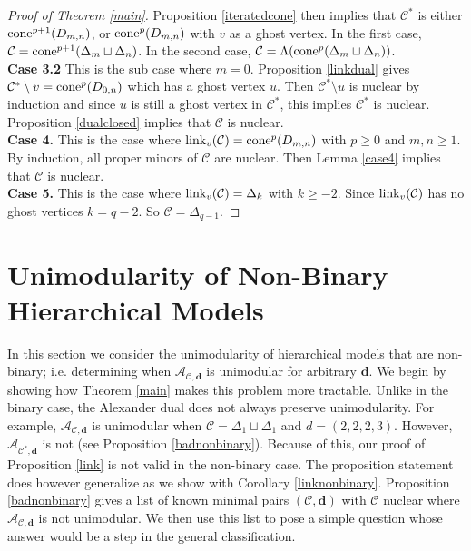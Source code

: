 \documentclass[letterpaper,12pt]{amsart}
\theoremstyle{plain}
\theoremstyle{definition}
\theoremstyle{remark}
\newcommand{\bfd}{\mathbf{d}}
\newcommand{\calc}{\mathcal{C}}
\newcommand{\link}{\textnormal{link}}
\newcommand{\cone}{\textnormal{cone}}
\begin{document}
\begin{proof}[Proof of Theorem \ref{main}]
	Proposition \ref{iteratedcone} then implies that $\mathcal{C}^*$ is either $\cone^{p+1}(D_{m,n})$, or $\cone^p(D_{m,n})$
	with $v$ as a ghost vertex.
	In the first case, $\mathcal{C} = \cone^{p+1}(\Delta_m \sqcup \Delta_n)$.
	In the second case, $\mathcal{C} = \Lambda(\cone^{p}(\Delta_m\sqcup \Delta_n))$.
	\\
	\indent
	{\bf Case 3.2}
	This is the sub case where $m = 0$.
	Proposition \ref{linkdual} gives $\mathcal{C}^*\setminus v = \cone^p(D_{0,n})$ which has a ghost vertex $u$.
	Then $\mathcal{C}^*\setminus u$ is nuclear by induction and since $u$ is still a ghost vertex in $\mathcal{C}^*$,
	this implies $\mathcal{C}^*$ is nuclear.
	Proposition \ref{dualclosed} implies that $\mathcal{C}$ is nuclear.
	\\
	\indent
	{\bf Case 4.}
	This is the case where $\link_v(\mathcal{C}) = \cone^p(D_{m,n})$ with $p \ge 0$ and $m,n \ge 1$.
	By induction, all proper minors of $\mathcal{C}$ are nuclear.
	Then Lemma \ref{case4} implies that $\mathcal{C}$ is nuclear.
	\\
	\indent
	{\bf Case 5.} This is the case where $\link_v(\mathcal{C}) = \Delta_{k}$ with $k \ge -2$.
	Since $\link_v(\mathcal{C})$ has no ghost vertices $k = q-2$.
	So $\mathcal{C} = \Delta_{q-1}$.
\end{proof}






\section{Unimodularity of  Non-Binary Hierarchical Models}\label{sec:non}

In this section we consider the unimodularity of hierarchical models that are non-binary;
i.e. determining when $\mathcal{A}_{\calc,\bfd}$ is unimodular for arbitrary $\bfd$.
We begin by showing how Theorem \ref{main} makes this problem more tractable.
Unlike in the binary case, 
the Alexander dual does not always preserve unimodularity.
{For example, $\mathcal{A}_{\calc,\bfd}$ is unimodular when $\calc = \Delta_1 \sqcup \Delta_1$ and $d = (2,2,2,3)$.
However, $\mathcal{A}_{\calc^*,\bfd}$ is not (see Proposition \ref{badnonbinary}).}
Because of this, our proof of Proposition \ref{link} is not  valid
in the non-binary case.
The proposition statement does however generalize as we show with Corollary \ref{linknonbinary}.
Proposition \ref{badnonbinary} gives a list of known
minimal pairs $(\mathcal{C},\bfd)$ with $\calc$ nuclear where $\mathcal{A}_{\calc,\bfd}$ is not unimodular.
We then use this list to pose a simple question whose answer would be a step in the general classification.
\end{document}
